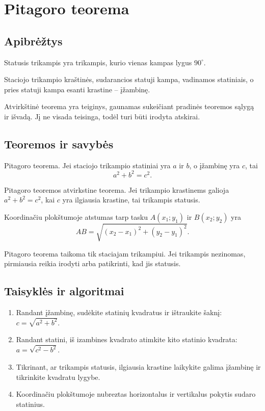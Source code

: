 \section{Pitagoro teorema}\label{sec:pitos-teorema}

\subsection{Apibrėžtys}
\begin{apibreztis}
Statusis trikampis yra trikampis, kurio vienas kampas lygus $90^\circ$.
\end{apibreztis}
\begin{apibreztis}
Staciojo trikampio kraštinės, sudarancios statuji kampa, vadinamos statiniais, o pries statuji kampa esanti krastine -- įžambinę.
\end{apibreztis}
\begin{apibreztis}
Atvirkštinė teorema yra teiginys, gaunamas sukeičiant pradinės teoremos sąlygą ir išvadą. Jį ne visada teisinga, todėl turi būti irodyta atskirai.
\end{apibreztis}

\subsection{Teoremos ir savybės}
\begin{teorema}
Pitagoro teorema. Jei staciojo trikampio statiniai yra $a$ ir $b$, o įžambinę yra $c$, tai
\[
a^2+b^2=c^2.
\]
\end{teorema}
\begin{teorema}
Pitagoro teoremos atvirkstine teorema. Jei trikampio krastinems galioja $a^2+b^2=c^2$, kai $c$ yra ilgiausia krastine, tai trikampis statusis.
\end{teorema}
\begin{savybe}
Koordinačiu plokštumoje atstumas tarp tasku $A(x_1;y_1)$ ir $B(x_2;y_2)$ yra
\[
AB=\sqrt{(x_2-x_1)^2+(y_2-y_1)^2}.
\]
\end{savybe}
\begin{pastaba}
Pitagoro teorema taikoma tik staciajam trikampiui. Jei trikampis nezinomas, pirmiausia reikia irodyti arba patikrinti, kad jis statusis.
\end{pastaba}

\subsection{Taisyklės ir algoritmai}
\begin{enumerate}[label=\arabic*.]
\item Randant įžambinę, sudėkite statinių kvadratus ir ištraukite šaknį: $c=\sqrt{a^2+b^2}$.
\item Randant statini, iš izambines kvadrato atimkite kito statinio kvadrata: $a=\sqrt{c^2-b^2}$.
\item Tikrinant, ar trikampis statusis, ilgiausia krastine laikykite galima įžambinę ir tikrinkite kvadratu lygybe.
\item Koordinačiu plokštumoje nubreztas horizontalus ir vertikalus pokytis sudaro statinius.
\end{enumerate}
